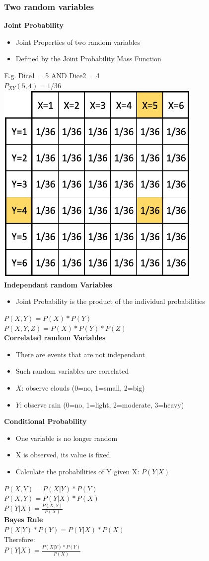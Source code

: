 \subsubsection{Two random variables}
\textbf{Joint Probability}
\begin{itemize}
    \item Joint Properties of two random variables
    \item Defined by the Joint Probability Mass Function
\end{itemize}
E.g. Dice1 = 5 AND Dice2 = 4\\
$P_{XY}(5,4) = 1/36$\\ 
\includegraphics[width=0.5\linewidth]{./img/joint_probability.png} \\
\textbf{Independant random Variables}
\begin{itemize}
    \item Joint Probability is the product of the individual probabilities
\end{itemize}
$P(X,Y) = P(X) * P(Y)$\\ 
$P(X,Y,Z) = P(X) * P(Y) * P(Z)$\\
\textbf{Correlated random Variables}
\begin{itemize}
    \item There are events that are not independant
    \item Such random variables are correlated
    \item $X$: observe clouds (0=no, 1=small, 2=big)
    \item $Y$: observe rain (0=no, 1=light, 2=moderate, 3=heavy)
\end{itemize}
\textbf{Conditional Probability}
\begin{itemize}
    \item One variable is no longer random
    \item X is observed, its value is fixed
    \item Calculate the probabilities of Y given X: $P(Y | X)$
\end{itemize}
$P(X, Y) = P(X | Y) * P(Y)$\\ 
$P(X, Y) = P(Y | X) * P(X)$\\
$P(Y | X) = \frac{P(X,Y)}{P(X)}$\\ 
\textbf{Bayes Rule}\\
$P(X|Y)*P(Y) = P(Y|X)*P(X)$\\ 
Therefore:\\
$P(Y|X) = \frac{P(X|Y)*P(Y)}{P(X)}$